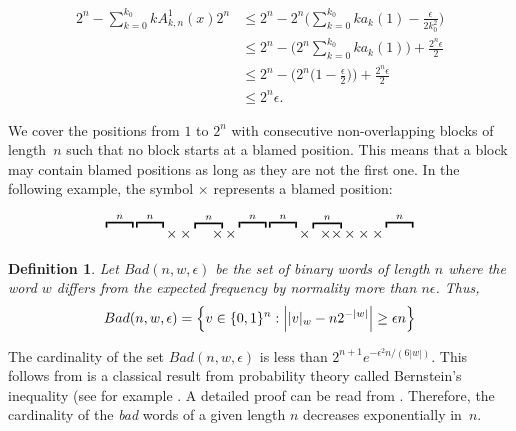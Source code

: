\documentclass[11pt,a4paper]{tesis}
\newtheorem{definition}{Definition}[]
\begin{document}
\begin{align*}
   2^n -  \sum_{k=0}^{k_0} kA^{1}_{k,n}(x) 2^n 
     &\leq 2^n - 2^n\Big(\sum_{k=0}^{k_0} k a_k(1) - \frac{\epsilon}{2k^2_0}\Big) \\
    &\leq 2^n -  \Big(2^n \sum_{k=0}^{k_0} ka_{k}(1)\Big) + \frac{2^n\epsilon}{2}\\
    &\leq 2^n - \Big(2^n \big(1-\frac{\epsilon}{2}\big)\Big) + \frac{2^n\epsilon }{2} \\
    &\leq 2^n\epsilon.
\end{align*}

We cover the positions from $1 $ to $2^n$ with consecutive
 non-overlapping blocks of length~$n$ such that 
no block starts at a blamed  position. 
This means that a block may contain blamed positions as long as they are not the first one. 
In the following example, the symbol $\times$ represents a blamed position:
 
$$\overbracket{\raisebox{6.4pt}{\qquad}}^{n} \overbracket{\raisebox{6.4pt}{\qquad}}^{n}\times\times\overbracket{\;\quad \times}^{n} \times \overbracket{\raisebox{6.4pt}{\qquad}}^{n} \overbracket{\raisebox{6.4pt}{\qquad}}^{n} \times \overbracket{\;\; \times \times}^{n} \times\times\times \overbracket{\raisebox{6.4pt}{\qquad}}^{n}$$


\begin{definition}
  Let $Bad(n, w, \epsilon)$ be the set of binary words of length $n$ where the word $w$ differs from the expected frequency by normality
 more than $n \epsilon$. Thus,
  $$Bad(n, w, \epsilon)=\Big{\{}v\in \{0,1\}^n: \Big{|} |v|_w - n 2^{-|w|} \Big{|} \geq \epsilon n \Big{\} }$$
\end{definition}


The cardinality of the set $Bad(n, w, \epsilon)$ is less than $2^{n+1} e^{-\epsilon^2 n/(6|w|)}$.
 This follows from  is a classical result from probability theory called Bernstein’s inequality (see for example \cite[Lemma 2.2.9]{VW}.   A detailed proof can be read from \cite[Lemma 7.3.5]{BC2018}. Therefore, the cardinality of the  \textit{bad} words of a given length $n$ decreases exponentially in~$n$.
\end{document}
